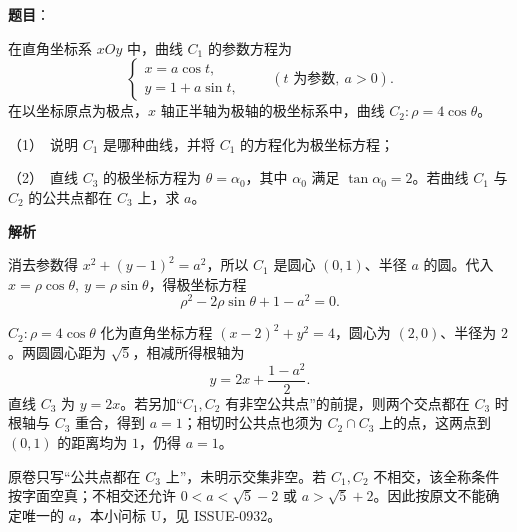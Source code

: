 \begin{answer}

\textbf{题目}：

在直角坐标系 \(xOy\) 中，曲线 \(C_1\) 的参数方程为
\nopagebreak[4]
\[
\begin{cases}
x=a\cos t,\\
y=1+a\sin t,
\end{cases}\qquad(t\text{ 为参数},\ a>0).
\]
在以坐标原点为极点，\(x\) 轴正半轴为极轴的极坐标系中，曲线 \(C_2:\rho=4\cos\theta\)。

   （1）　说明 \(C_1\) 是哪种曲线，并将 \(C_1\) 的方程化为极坐标方程；

   （2）　直线 \(C_3\) 的极坐标方程为 \(\theta=\alpha_0\)，其中 \(\alpha_0\) 满足 \(\tan\alpha_0=2\)。若曲线 \(C_1\) 与 \(C_2\) 的公共点都在 \(C_3\) 上，求 \(a\)。

\textbf{解析}


消去参数得 \(x^2+(y-1)^2=a^2\)，所以 \(C_1\) 是圆心 \((0,1)\)、半径 \(a\) 的圆。代入 \(x=\rho\cos\theta,\ y=\rho\sin\theta\)，得极坐标方程
\nopagebreak[4]
\[
\rho^2-2\rho\sin\theta+1-a^2=0.
\]


\(C_2:\rho=4\cos\theta\) 化为直角坐标方程 \((x-2)^2+y^2=4\)，圆心为 \((2,0)\)、半径为 \(2\)。两圆圆心距为 \(\sqrt5\)，相减所得根轴为
\nopagebreak[4]
\[
y=2x+\frac{1-a^2}{2}.
\]
直线 \(C_3\) 为 \(y=2x\)。若另加“\(C_1,C_2\) 有非空公共点”的前提，则两个交点都在 \(C_3\) 时根轴与 \(C_3\) 重合，得到 \(a=1\)；相切时公共点也须为 \(C_2\cap C_3\) 上的点，这两点到 \((0,1)\) 的距离均为 \(1\)，仍得 \(a=1\)。

原卷只写“公共点都在 \(C_3\) 上”，未明示交集非空。若 \(C_1,C_2\) 不相交，该全称条件按字面空真；不相交还允许 \(0<a<\sqrt5-2\) 或 \(a>\sqrt5+2\)。因此按原文不能确定唯一的 \(a\)，本小问标 U，见 ISSUE-0932。



\end{answer}
